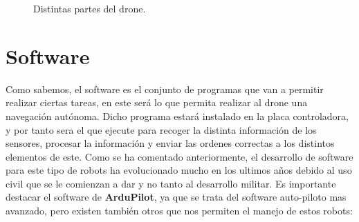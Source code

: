 \begin{figure}[H]
 \centering
 \caption{Distintas partes del drone.}
 \label{f:Test 1}
\end{figure} 


\section{Software}
\hspace{1 cm} Como sabemos, el software es el conjunto de programas que van a permitir realizar ciertas tareas, en este ser\'a lo que permita realizar al drone una navegaci\'on aut\'onoma. Dicho programa estar\'a instalado en la placa controladora, y por tanto sera el que ejecute para recoger la distinta informaci\'on de los sensores, procesar la informaci\'on y enviar las ordenes correctas a los distintos elementos de este. Como se ha comentado anteriormente, el desarrollo de software para este tipo de robots ha evolucionado mucho en los ultimos años debido al uso civil que se le comienzan a dar y no tanto al desarrollo militar. Es importante destacar el software de \textbf{ArduPilot}, ya que se trata del software auto-piloto mas avanzado, pero existen tambi\'en otros que nos permiten el manejo de estos robots:

